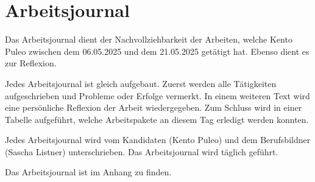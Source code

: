 \chapter{Arbeitsjournal}
\vspace{-3em}
Das Arbeitsjournal dient der Nachvollziehbarkeit der Arbeiten, welche Kento Puleo zwischen 
dem 06.05.2025 und dem 21.05.2025 getätigt hat. Ebenso dient es zur Reflexion.

Jedes Arbeitsjournal ist gleich aufgebaut. Zuerst werden alle Tätigkeiten aufgeschrieben und Probleme oder 
Erfolge vermerkt. In einem weiteren Text wird eine persönliche Reflexion der Arbeit wiedergegeben. Zum Schluss
wird in einer Tabelle aufgeführt, welche Arbeitspakete an diesem Tag erledigt werden konnten.

Jedes Arbeitsjournal wird vom Kandidaten (Kento Puleo) und dem Berufsbildner
(Sascha Listner) unterschrieben. Das Arbeitsjournal wird täglich geführt.

Das Arbeitsjournal ist im Anhang zu finden.
